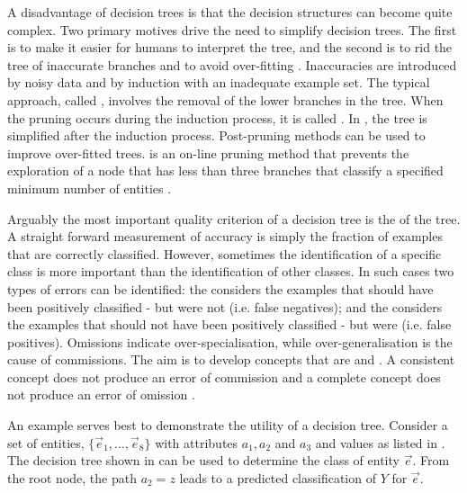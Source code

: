 A disadvantage of decision trees is that the decision structures can become quite complex. Two primary motives drive the need to simplify decision trees.  The first is to make it easier for humans to interpret the tree, and the second is to rid the tree of inaccurate branches and to avoid over-fitting \cite{kubat:review}.  Inaccuracies are introduced by noisy data and by induction with an inadequate example set.  The typical approach, called  , involves the removal of the lower branches in the tree. When the pruning occurs during the induction process, it is called .  In , the tree is simplified after the induction process.  Post-pruning methods can be used to improve over-fitted trees.  is an on-line pruning method that prevents the exploration of a node that has less than three branches that classify a specified minimum number of entities \cite{quinlan:c45}. 

Arguably the most important quality criterion of a decision tree is the \newline {} of the tree.  A straight forward measurement of accuracy is simply the fraction of examples that are correctly classified.   However, sometimes the identification of a specific class is more important than the identification of other classes. In such cases two types of errors can be identified: the  considers the examples that should have been positively classified - but were not (i.e. false negatives); and the  considers the examples that should not have been positively classified - but were (i.e. false positives).  Omissions indicate over-specialisation, while over-generalisation is the cause of commissions. The aim is to develop concepts that are   and . A consistent concept does not produce an error of commission and a complete concept does not produce an error of omission \cite{kubat:review}.   


An example serves best to demonstrate the utility of a decision tree. Consider a set of entities, $\{\vec e_1,\ldots, \vec e_8\}$ with attributes $a_1,a_2$ and $a_3$ and values as listed in .  The decision tree shown in  can be used to determine the class of entity $\vec e$.  From the root node, the path $a_2 = z$ leads to a predicted classification of $Y$ for $\vec e$.  

